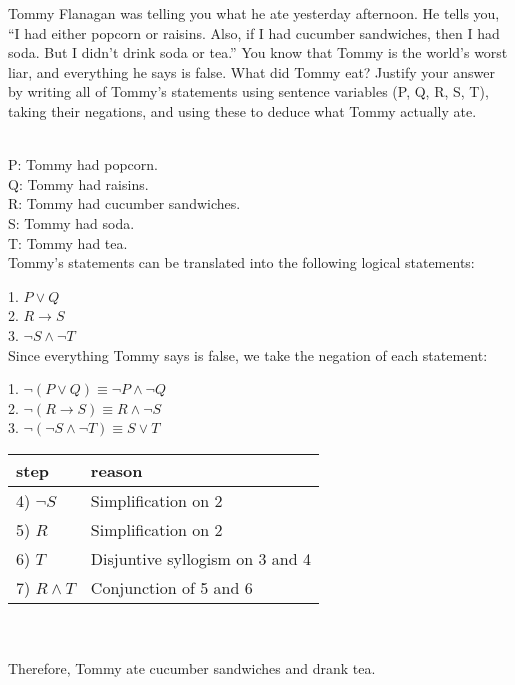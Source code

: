 \documentclass[a4paper]{exam}
\begin{document}
\begin{questions}
  \question Tommy Flanagan was telling you what he ate yesterday afternoon. He tells you, “I had either popcorn or raisins. Also, if I had cucumber sandwiches, then I had soda. But I didn't drink soda or tea.” You know that Tommy is the world’s worst liar, and everything he says is false. What did Tommy eat?
Justify your answer by writing all of Tommy's statements using sentence variables (P, Q, R, S, T), taking their negations, and using these to deduce what Tommy actually ate.

  \begin{solution}\\
    P: Tommy had popcorn. \\
    Q: Tommy had raisins. \\
    R: Tommy had cucumber sandwiches. \\
    S: Tommy had soda. \\
    T: Tommy had tea. \\

    Tommy's statements can be translated into the following logical statements:

    1. $P \lor Q$ \\
    2. $R \rightarrow S$ \\
    3. $\neg S \land \neg T$ \\

    Since everything Tommy says is false, we take the negation of each statement:

    1. $\neg (P \lor Q) \equiv \neg P \land \neg Q$ \\
    2. $\neg (R \rightarrow S) \equiv R \land \neg S$ \\
    3. $\neg (\neg S \land \neg T) \equiv S \lor T$ \\

    \begin{tabular}{|l|l|}
      \hline
      step & reason\\
      \hline
      4) $\neg S$ & Simplification on 2\\ 
      5) $R$ & Simplification on 2\\
      6) $T$ & Disjuntive syllogism on 3 and 4\\
      7) $R \land T$ & Conjunction of 5 and 6\\
      \hline
    
    \end{tabular}\\\\
    Therefore, Tommy ate cucumber sandwiches and drank tea.


\end{solution}
\end{questions}
\end{document}
